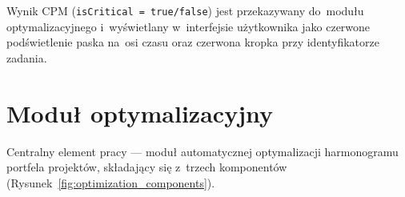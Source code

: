 Wynik CPM (\texttt{isCritical = true/false}) jest przekazywany do~modułu optymalizacyjnego i~wyświetlany w~interfejsie użytkownika jako czerwone podświetlenie paska na~osi czasu oraz czerwona kropka przy identyfikatorze zadania.

\section{Moduł optymalizacyjny}

Centralny element pracy --- moduł automatycznej optymalizacji harmonogramu portfela projektów, składający się z~trzech komponentów (Rysunek~\ref{fig:optimization_components}).

